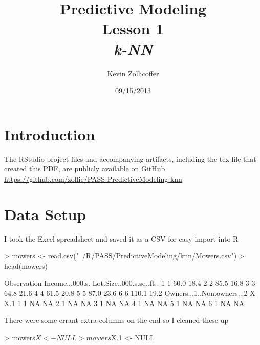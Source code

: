 \documentclass{article}
\author{Kevin Zollicoffer}
\title{Predictive Modeling\\Lesson 1\\\emph{k-NN}}
\date{09/15/2013}
\begin{document}
\maketitle


\section*{Introduction}
The RStudio project files and accompanying artifacts, including the tex file that created this PDF, are publicly available on GitHub
\\
\url{https://github.com/zollie/PASS-PredictiveModeling-knn}

\section*{Data Setup}
I took the Excel spreadsheet and saved it as a CSV for easy import into R
\begin{Schunk}
\begin{Sinput}
> mowers <- read.csv("~/R/PASS/PredictiveModeling/knn/Mowers.csv")
> head(mowers)
\end{Sinput}
\begin{Soutput}
  Observation Income...000.s. Lot.Size..000.s.sq..ft..
1           1            60.0                     18.4
2           2            85.5                     16.8
3           3            64.8                     21.6
4           4            61.5                     20.8
5           5            87.0                     23.6
6           6           110.1                     19.2
  Owners...1..Non.owners...2  X X.1
1                          1 NA  NA
2                          1 NA  NA
3                          1 NA  NA
4                          1 NA  NA
5                          1 NA  NA
6                          1 NA  NA
\end{Soutput}
\end{Schunk}
There were some errant extra columns on the end so I cleaned these up
\begin{Schunk}
\begin{Sinput}
> mowers$X <- NULL
> mowers$X.1 <- NULL
\end{Sinput}
\end{Schunk}
\end{document}
